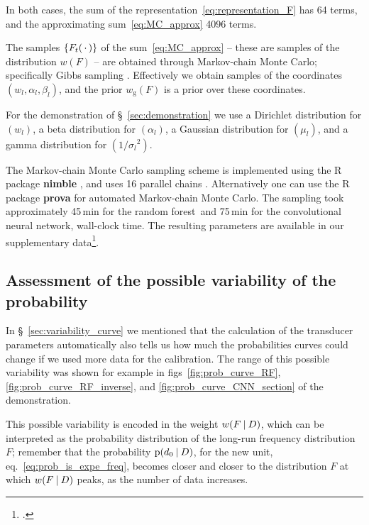 \documentclass[a4paper,12pt,%
onecolumn,oneside,article,%
british%
]{memoir}
\newcommand*{\dotv}{\mathord{\,\cdot\,}}%
\DeclarePairedDelimiter\set{\{}{\}} %
\newcommand*{\p}{\mathrm{p}}%
\renewcommand*{\|}[1][]{\nonscript\:#1\vert\nonscript\:\mathopen{}}
\newcommand*{\sect}{\S}%
\newcommand*{\chap}{ch.}%
\newcommand*{\eqn}{eq.}%
\newcommand*{\figs}{figs}%
\newcommand*{\wf}{w}
\newcommand*{\wfo}{w_{\textrm{g}}}
\newcommand*{\RF}{random forest}
\newcommand*{\CNN}{convolutional neural network}
\begin{document}
In both cases, the sum of the representation~\eqref{eq:representation_F} has 64 terms, and the approximating sum~\eqref{eq:MC_approx} 4096 terms.

\medskip


The samples $\set{F_{t}(\dotv)}$ of the sum~\eqref{eq:MC_approx} -- these are samples of the distribution $\wf(F)$ -- are obtained through Markov-chain Monte Carlo; specifically Gibbs sampling \autocites{neal1993}[\chap~29]{mackay1995_r2005}.
Effectively we obtain samples of the coordinates $(w_{l}, \alpha_{l}, \beta_{l})$, and the prior $\wfo(F)$ is a prior over these coordinates.

For the demonstration of \sect~\ref{sec:demonstration} we use a Dirichlet distribution for $(w_{l})$, a beta distribution for $(\alpha_{l})$, a Gaussian distribution for $(\mu_{l})$, and a gamma distribution for $(1/{\sigma_{l}}^{2})$.

The Markov-chain Monte Carlo sampling scheme is implemented using the R \autocites{rcoreteam1995} package \textbf{nimble} \autocites{nimble2016_r2021}, and uses 16 parallel chains \autocites[\addcomma\ scripts \texttt{RFmcmc.R} and \texttt{NNmcmc.R}]{dyrlandetal2022c}. Alternatively one can use the R package \textbf{prova} \autocites{portamana2024} for automated Markov-chain Monte Carlo. The sampling took approximately 45\,min for the \RF\ and 75\,min for the \CNN, wall-clock time. The resulting parameters are available in our supplementary data\footcites[\addcomma\ files \texttt{transducer\_params-Random\_Forest.zip} and \texttt{transducer\_params-Neural\_Net.zip}]{dyrlandetal2022c}.

\subsection{Assessment of the possible variability of the probability}
\label{sec:variability_prob}

In \sect~\ref{sec:variability_curve} we mentioned that the calculation of the transducer parameters automatically also tells us how much the probabilities curves could change if we used more data for the calibration. The range of this possible variability was shown for example in \figs~\ref{fig:prob_curve_RF}, \ref{fig:prob_curve_RF_inverse}, and \ref{fig:prob_curve_CNN_section} of the demonstration.

This possible variability is encoded in the weight $\wf(F \| D)$, which can be interpreted as the probability distribution of the long-run frequency distribution $F$; remember that the probability $\p(d_{0} \| D)$, for the new unit, \eqn~\eqref{eq:prob_is_expe_freq}, becomes closer and closer to the distribution $F$ at which $\wf(F \| D)$ peaks, as the number of data increases.
\end{document}
